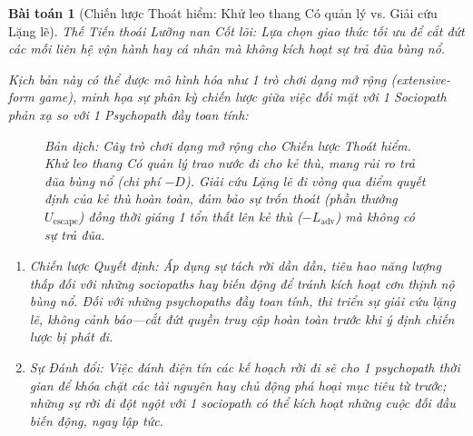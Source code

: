 \documentclass{article}
\newtheorem{baitoan}{Bài toán}
\begin{document}
\begin{baitoan}[Chiến lược Thoát hiểm: Khử leo thang Có quản lý vs. Giải cứu Lặng lẽ]
	\emph{Thế Tiến thoái Lưỡng nan Cốt lõi:} Lựa chọn giao thức tối ưu để cắt đứt các mối liên hệ vận hành hay cá nhân mà không kích hoạt sự trả đũa bùng nổ.
	
	Kịch bản này có thể được mô hình hóa như 1 trò chơi dạng mở rộng (extensive-form game), minh họa sự phân kỳ chiến lược giữa việc đối mặt với 1 Sociopath phản xạ so với 1 Psychopath đầy toan tính:
	
	\begin{figure}[H]
		\centering
		\caption{Bản dịch: Cây trò chơi dạng mở rộng cho Chiến lược Thoát hiểm. \emph{Khử leo thang Có quản lý} trao nước đi cho kẻ thù, mang rủi ro trả đũa bùng nổ (chi phí $-D$). \emph{Giải cứu Lặng lẽ} đi vòng qua điểm quyết định của kẻ thù hoàn toàn, đảm bảo sự trốn thoát (phần thưởng $U_{\text{escape}}$) đồng thời giáng 1 tổn thất lên kẻ thù ($-L_{\text{adv}}$) mà không có sự trả đũa.}
	\end{figure}
	
	\begin{enumerate}[label=(\roman*)]
		\item \emph{Chiến lược Quyết định:} Áp dụng sự tách rời dần dần, tiêu hao năng lượng thấp đối với những sociopaths hay biến động để tránh kích hoạt cơn thịnh nộ bùng nổ. Đối với những psychopaths đầy toan tính, thi triển \textit{sự giải cứu lặng lẽ, không cảnh báo}---cắt đứt quyền truy cập hoàn toàn trước khi ý định chiến lược bị phát đi.
		\item \emph{Sự Đánh đổi:} Việc đánh điện tín các kế hoạch rời đi sẽ cho 1 psychopath thời gian để khóa chặt các tài nguyên hay chủ động phá hoại mục tiêu từ trước; những sự rời đi đột ngột với 1 sociopath có thể kích hoạt những cuộc đối đầu biến động, ngay lập tức.
	\end{enumerate}
\end{baitoan}
\end{document}
